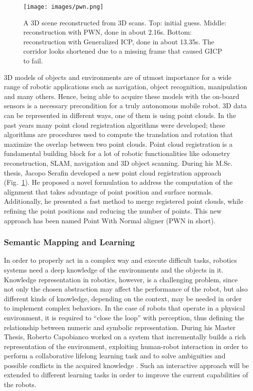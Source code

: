 \documentclass[conference]{IEEEtran}
\begin{document}
\begin{figure}[t!]
\begin{center}
\texttt{[image: images/pwn.png]}
\end{center}
\caption{A 3D scene reconstructed from 3D scans. Top: initial guess. Middle: reconstruction with PWN, done in about 2.16s. Bottom: reconstruction with Generalized ICP, done in about 13.35s. The corridor looks shortened due to a missing frame that caused GICP to fail.}\label{fig:pwn}
\end{figure}

3D models of objects and environments are of utmost importance for a wide range of robotic applications such as navigation, object recognition, manipulation and many others. Hence, being able to acquire these models with the on-board sensors is a necessary precondition for a truly autonomous mobile robot. 3D data can be represented in different ways, one of them is using point clouds. In the past years many point cloud registration algorithms were developed; these algorithms are procedures used to compute the translation and rotation that maximize the overlap between two point clouds. Point cloud registration is a fundamental building block for a lot of robotic functionalities like odometry reconstruction, SLAM, navigation and 3D object scanning. During his M.Sc. thesis, Jacopo Serafin developed a new point cloud registration approach (Fig.~\ref{fig:pwn}). He proposed a novel formulation to address the computation of the alignment that takes advantage of point position and surface normals. Additionally, he presented a fast method to merge registered point clouds, while refining the point positions and reducing the number of points. This new approach has been named Point With Normal aligner (PWN in short).   

\subsubsection{Semantic Mapping and Learning}\label{sec:semantic_map}
In order to properly act in a complex way and execute difficult tasks, robotics systems need a deep knowledge of the environments and the objects in it. Knowledge representation in robotics, however, is a challenging problem, since not only the chosen abstraction may affect the performance of the robot, but also different kinds of knowledge, depending on the context, may be needed in order to implement complex behaviors. In the case of robots that operate in a physical environment, it is required to “close the loop” with perception, thus defining the relationship between numeric and symbolic representation. During his Master Thesis, Roberto Capobianco worked on a system that incrementally builds a rich representation of the environment, exploiting human-robot interaction in order to perform a collaborative lifelong learning task and to solve ambiguities and possible conflicts in the acquired knowledge \cite{bastianelli2013line}\cite{bastianelliBCGIN13}. Such an interactive approach will be extended to different learning tasks in order to improve the current capabilities of the robots.
\end{document}
